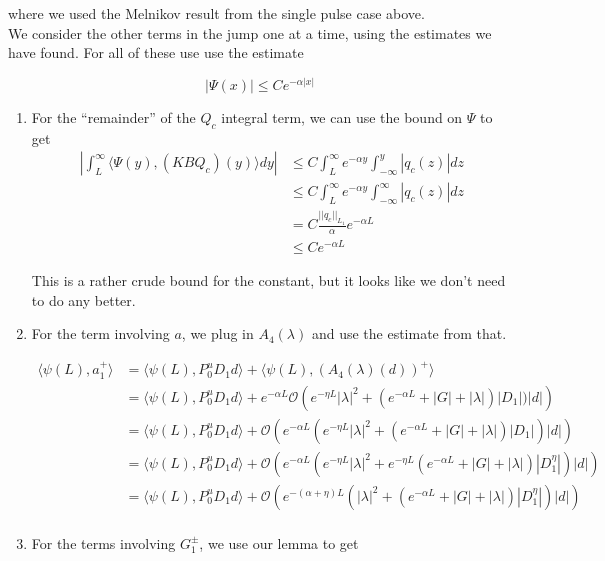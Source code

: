 \documentclass[12pt]{article}
\begin{document}
where we used the Melnikov result from the single pulse case above.\\

We consider the other terms in the jump one at a time, using the estimates we have found. For all of these use use the estimate

\[
|\Psi(x)| \leq C e^{-\alpha|x|}
\]

\begin{enumerate}

\item For the ``remainder'' of the $Q_c$ integral term, we can use the bound on $\Psi$ to get 
\begin{align*}
\left| \int_L^\infty \langle \Psi(y), (K B Q_c)(y) \rangle dy \right| &\leq C \int_L^\infty e^{-\alpha y} \int_{-\infty}^y |q_c(z)| dz\\
&\leq C \int_L^\infty e^{-\alpha y} \int_{-\infty}^\infty |q_c(z)| dz\\
&= C \frac{||q_c||_{L_1}}{\alpha}e^{-\alpha L} \\
&\leq C e^{-\alpha L} 
\end{align*}

This is a rather crude bound for the constant, but it looks like we don't need to do any better.

\item For the term involving $a$, we plug in $A_4(\lambda)$ and use the estimate from that. 

\begin{align*}
\langle \psi(L), a_1^+ \rangle &= \langle \psi(L), P_0^u D_1 d \rangle + \langle \psi(L), (A_4(\lambda)(d))^+\rangle\\
&= \langle \psi(L), P_0^u D_1 d \rangle + e^{-\alpha L} \mathcal{O} \left( e^{-\eta L}|\lambda|^2 + (e^{-\alpha L} + |G| + |\lambda|)|D_1|)|d| \right)\\
&= \langle \psi(L), P_0^u D_1 d \rangle + \mathcal{O} \left( e^{-\alpha L} (e^{-\eta L}|\lambda|^2 + (e^{-\alpha L} + |G| + |\lambda|)|D_1|)|d| \right)\\
&= \langle \psi(L), P_0^u D_1 d \rangle + \mathcal{O} \left( e^{-\alpha L} (e^{-\eta L}|\lambda|^2 + e^{-\eta L}(e^{-\alpha L} + |G| + |\lambda|)|D_1^\eta|)|d| \right)\\
&= \langle \psi(L), P_0^u D_1 d \rangle + \mathcal{O} \left( e^{-(\alpha +\eta) L}(|\lambda|^2 + (e^{-\alpha L} + |G| + |\lambda|)|D_1^\eta|)|d| \right)\\
\end{align*} 

\item For the terms involving $G_1^\pm$, we use our lemma to get 


\end{enumerate}
\end{document}
